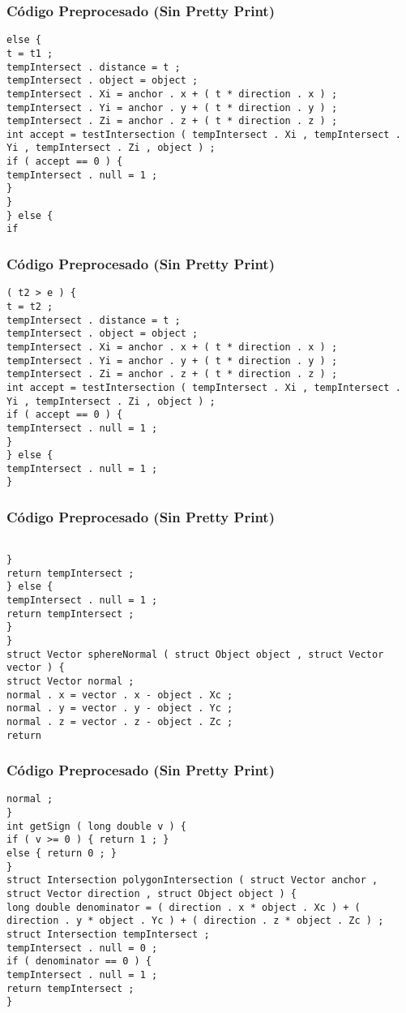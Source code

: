 \documentclass{beamer}
\begin{document}
\begin{frame}[fragile]
\frametitle{C\'odigo Preprocesado (Sin Pretty Print)}
\begin{lstlisting}[style=CStyle]
else { 
t = t1 ; 
tempIntersect . distance = t ; 
tempIntersect . object = object ; 
tempIntersect . Xi = anchor . x + ( t * direction . x ) ; 
tempIntersect . Yi = anchor . y + ( t * direction . y ) ; 
tempIntersect . Zi = anchor . z + ( t * direction . z ) ; 
int accept = testIntersection ( tempIntersect . Xi , tempIntersect . Yi , tempIntersect . Zi , object ) ; 
if ( accept == 0 ) { 
tempIntersect . null = 1 ; 
} 
} 
} else { 
if \end{lstlisting}
\end{frame}
\begin{frame}[fragile]
\frametitle{C\'odigo Preprocesado (Sin Pretty Print)}
\begin{lstlisting}[style=CStyle]
( t2 > e ) { 
t = t2 ; 
tempIntersect . distance = t ; 
tempIntersect . object = object ; 
tempIntersect . Xi = anchor . x + ( t * direction . x ) ; 
tempIntersect . Yi = anchor . y + ( t * direction . y ) ; 
tempIntersect . Zi = anchor . z + ( t * direction . z ) ; 
int accept = testIntersection ( tempIntersect . Xi , tempIntersect . Yi , tempIntersect . Zi , object ) ; 
if ( accept == 0 ) { 
tempIntersect . null = 1 ; 
} 
} else { 
tempIntersect . null = 1 ; 
} \end{lstlisting}
\end{frame}
\begin{frame}[fragile]
\frametitle{C\'odigo Preprocesado (Sin Pretty Print)}
\begin{lstlisting}[style=CStyle]

} 
return tempIntersect ; 
} else { 
tempIntersect . null = 1 ; 
return tempIntersect ; 
} 
} 
struct Vector sphereNormal ( struct Object object , struct Vector vector ) { 
struct Vector normal ; 
normal . x = vector . x - object . Xc ; 
normal . y = vector . y - object . Yc ; 
normal . z = vector . z - object . Zc ; 
return \end{lstlisting}
\end{frame}
\begin{frame}[fragile]
\frametitle{C\'odigo Preprocesado (Sin Pretty Print)}
\begin{lstlisting}[style=CStyle]
normal ; 
} 
int getSign ( long double v ) { 
if ( v >= 0 ) { return 1 ; } 
else { return 0 ; } 
} 
struct Intersection polygonIntersection ( struct Vector anchor , struct Vector direction , struct Object object ) { 
long double denominator = ( direction . x * object . Xc ) + ( direction . y * object . Yc ) + ( direction . z * object . Zc ) ; 
struct Intersection tempIntersect ; 
tempIntersect . null = 0 ; 
if ( denominator == 0 ) { 
tempIntersect . null = 1 ; 
return tempIntersect ; 
} \end{lstlisting}
\end{frame}
\end{document}
